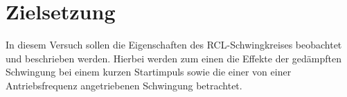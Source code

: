 \section{Zielsetzung}
In diesem Versuch sollen die Eigenschaften des RCL-Schwingkreises beobachtet und beschrieben werden.
Hierbei werden zum einen die Effekte der gedämpften Schwingung bei einem kurzen Startimpuls sowie die
einer von einer Antriebsfrequenz angetriebenen Schwingung betrachtet.